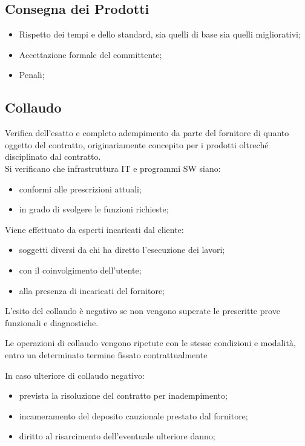 \documentclass{article}
\begin{document}
\subsection{Consegna dei Prodotti}\label{sub:consegna_dei_prodotti} %
\begin{itemize}
    \item Rispetto dei tempi e dello standard, sia quelli di base sia quelli migliorativi;
    \item Accettazione formale del committente;
    \item Penali;
\end{itemize}
%
\subsection{Collaudo}\label{sub:collaudo} %
Verifica dell'esatto e completo adempimento da parte del fornitore di quanto oggetto del contratto, originariamente concepito per i prodotti oltreché disciplinato dal contratto.
\\
Si verificano che infrastruttura IT e programmi SW siano:
\begin{itemize}
    \item conformi alle prescrizioni attuali;
    \item in grado di svolgere le funzioni richieste;
\end{itemize}
\begin{note}
    Viene effettuato da esperti incaricati dal cliente:
    \begin{itemize}
        \item soggetti diversi da chi ha diretto l'esecuzione dei lavori;
        \item con il coinvolgimento dell'utente;
        \item alla presenza di incaricati del fornitore;
    \end{itemize}
\end{note}
L'esito del collaudo è negativo se non vengono superate le prescritte prove funzionali e diagnostiche.
\begin{note}
    Le operazioni di collaudo vengono ripetute con le stesse condizioni e modalità, entro un determinato termine fissato contrattualmente
\end{note}
In caso ulteriore di collaudo negativo:
\begin{itemize}
    \item prevista la risoluzione del contratto per inadempimento;
    \item incameramento del deposito cauzionale prestato dal fornitore;
    \item diritto al risarcimento dell'eventuale ulteriore danno;
\end{itemize}
\end{document}
